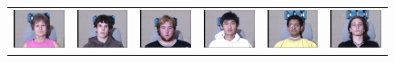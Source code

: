 \documentclass[10pt,journal,letterpaper,compsoc]{IEEEtran} %
\begin{document}
\newcommand{\tempwidth}[0]{0.58in}
\begin{figure}
\centering
{\small
\begin{tabular}{@{}c@{}c@{}c@{}c@{}c@{}c@{}}
\hspace{-2mm}\includegraphics[width=\tempwidth,clip=true]{figures_pami/multipie_failed/079_01_01_051_08.png}  &
\includegraphics[width=\tempwidth,clip=true]{figures_pami/multipie_failed/111_01_01_051_08.png}  &
\includegraphics[width=\tempwidth,clip=true]{figures_pami/multipie_failed/196_01_01_051_08.png}  &
\includegraphics[width=\tempwidth,clip=true]{figures_pami/multipie_failed/130_01_01_051_08.png}  &
\includegraphics[width=\tempwidth,clip=true]{figures_pami/multipie_failed/163_01_01_051_08.png}  &
\includegraphics[width=\tempwidth,clip=true]{figures_pami/multipie_failed/175_01_01_051_08.png} \\

\end{tabular}}
\end{figure}
\end{document}
